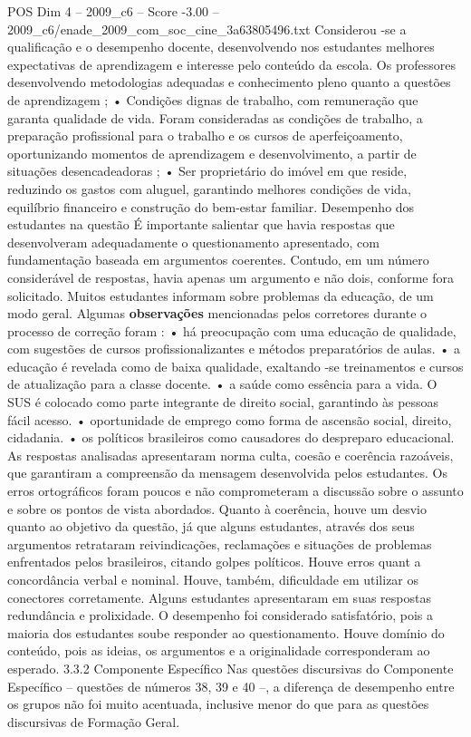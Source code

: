 \begin{textsample}{POS Dim 4 – 2009\_c6 – Score -3.00 – 2009\_c6/enade\_2009\_com\_soc\_cine\_3a63805496.txt}
Considerou -se a qualificação e o desempenho docente, desenvolvendo nos estudantes melhores expectativas de aprendizagem e interesse pelo conteúdo da escola.
Os professores desenvolvendo metodologias adequadas e conhecimento pleno quanto a questões de aprendizagem ; • Condições dignas de trabalho, com remuneração que garanta qualidade de vida.
Foram consideradas as condições de trabalho, a preparação profissional para o trabalho e os cursos de aperfeiçoamento, oportunizando momentos de aprendizagem e desenvolvimento, a partir de situações desencadeadoras ; • Ser proprietário do imóvel em que reside, reduzindo os gastos com aluguel, garantindo melhores condições de vida, equilíbrio financeiro e construção do bem-estar familiar.
Desempenho dos estudantes na questão É importante salientar que havia respostas que desenvolveram adequadamente o questionamento apresentado, com fundamentação baseada em argumentos coerentes.
Contudo, em um número considerável de respostas, havia apenas um argumento e não dois, conforme fora solicitado.
Muitos estudantes informam sobre problemas da educação, de um modo geral.
Algumas \textbf{observações} mencionadas pelos corretores durante o processo de correção foram : • há preocupação com uma educação de qualidade, com sugestões de cursos profissionalizantes e métodos preparatórios de aulas. • a educação é revelada como de baixa qualidade, exaltando -se treinamentos e cursos de atualização para a classe docente. • a saúde como essência para a vida.
O SUS é colocado como parte integrante de direito social, garantindo às pessoas fácil acesso. • oportunidade de emprego como forma de ascensão social, direito, cidadania. • os políticos brasileiros como causadores do despreparo educacional.
As respostas analisadas apresentaram norma culta, coesão e coerência razoáveis, que garantiram a compreensão da mensagem desenvolvida pelos estudantes.
Os erros ortográficos foram poucos e não comprometeram a discussão sobre o assunto e sobre os pontos de vista abordados.
Quanto à coerência, houve um desvio quanto ao objetivo da questão, já que alguns estudantes, através dos seus argumentos retrataram reivindicações, reclamações e situações de problemas enfrentados pelos brasileiros, citando golpes políticos.
Houve erros quant a concordância verbal e nominal.
Houve, também, dificuldade em utilizar os conectores corretamente.
Alguns estudantes apresentaram em suas respostas redundância e prolixidade.
O desempenho foi considerado satisfatório, pois a maioria dos estudantes soube responder ao questionamento.
Houve domínio do conteúdo, pois as ideias, os argumentos e a originalidade corresponderam ao esperado. 3.3.2 Componente Específico Nas questões discursivas do Componente Específico – questões de números 38, 39 e 40 –, a diferença de desempenho entre os grupos não foi muito acentuada, inclusive menor do que para as questões discursivas de Formação Geral.

\end{textsample}

